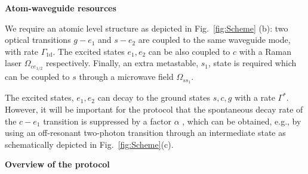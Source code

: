 \documentclass[twocolumn,pra,aps,superscriptaddress,showpacs]{revtex4-1}
\def\oned{\mathrm{1d}}
\begin{document}
\textbf{Atom-waveguide resources}

We require an atomic level structure as depicted in Fig.~\ref{fig:Scheme} (b): two optical transitions $g-e_1$ and $s-e_2$ are coupled to the same waveguide mode, with rate $\Gamma_\oned$. The excited states $e_1,e_2$ can be also coupled to $c$ with a Raman laser $\Omega_{ce_{1/2}}$ respectively. Finally, an extra metastable, $s_1$, state is required which can be coupled to $s$ through a microwave field $\Omega_{s s_1}$.

The excited states, $e_1,e_2$ can decay to the ground states $s,c,g$ with a rate $\Gamma^*$. However, it will be important for the protocol that the spontaneous decay rate of the $c-e_1$ transition is suppressed by a factor $\alpha$  \cite{enk97,porras08a,borregaard15a}, which can be obtained, e.g., by using an off-resonant two-photon transition through an intermediate state as schematically depicted in Fig.~\ref{fig:Scheme}(c).

\textbf{Overview of the protocol}
\end{document}
